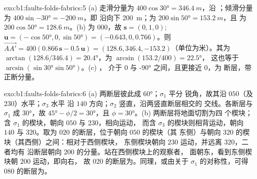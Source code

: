 \begin{solution}{exo:b1:faults-folds-fabrics:5}
(a) 走滑分量为 $400\cos\ang{30} = \qty{346.4}{m}$，沿
；倾滑分量为 $400\sin\ang{-30} = \qty{-200}{m}$，即
沿向下 \qty{200}{m}；为 $200\sin\ang{50} = \qty{153.2}{m}$，且
为 $200\cos\ang{50} = \qty{128.6}{m}$。(b) 为 $000$，故
$\mathbf s = (0, 1, 0)$; $\mathbf u = (-\cos\ang{50}, 0, \sin\ang{50}) =
(-0.643, 0, 0.766)$。则
$\overrightarrow{AA'} = 400(0.866\,\mathbf s - 0.5\,\mathbf u) =
(128.6, 346.4, -153.2)$（单位为米）。其为 $\arctan(128.6/346.4) =
\ang{20.4}$，为 $\arcsin(153.2/400) = \ang{22.5}$，
这也等于 $\arcsin(\sin\ang{30}\sin\ang{50})$。(c) ，
介于 $0$ 与 \ang{-90} 之间，且更接近 $0$，为
断层，带正断分量。
\end{solution}

\begin{solution}{exo:b1:faults-folds-fabrics:6}
(a) 两断层彼此成 \ang{60}；$\sigma_1$ 平分
锐角，故其沿 $050$（及 $230$）水平；$\sigma_3$ 水平
沿 $140$ 方向；$\sigma_2$ 竖直，沿两竖直断层相交的
交线。各断层与 $\sigma_1$ 成 \ang{30}，故 $\ang{45} - \phi/2 =
\ang{30}$，且 $\phi = \ang{30}$。(b) 两断层将地面切割为四
个楔块；含 $\sigma_1$ 的楔块，朝向 $050$ 与 $230$，相向运动，
而含 $\sigma_3$ 的楔块则相背运动，朝向 $140$
与 $320$。取为 $020$ 的断层，位于朝向 $050$ 的楔块（其
东侧）与朝向 $320$ 的楔块（其西侧）之间：相对于西侧楔块，
东侧楔块朝向 $230$ 运动，并远离 $320$，二者均有
沿断层朝向 $200$ 的分量。站在西侧楔块上的观察者，
面朝东，看到东侧楔块朝 $200$ 运动，即向右，
故 $020$ 的断层为。同理，或由关于
$\sigma_1$ 的对称性，可得 $080$ 的断层为。
\end{solution}

